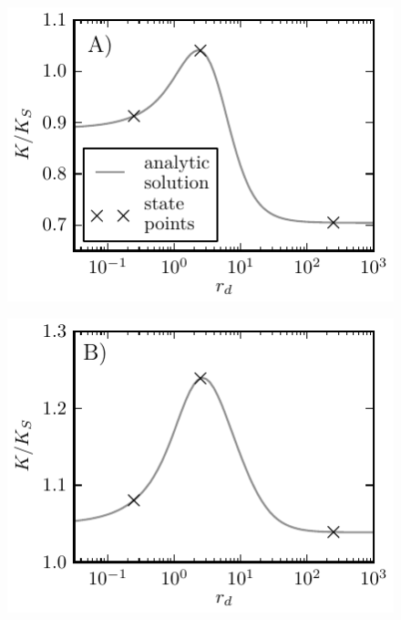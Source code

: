 \begin{minipage}[t]{0.5 \textwidth}
    \begin{figure}[H]
        \includegraphics[width = 1 \textwidth]{plots/rb_rate.pdf}
    \end{figure}
\end{minipage}\begin{minipage}[t]{0.5 \textwidth}
    \begin{figure}[H]
        \includegraphics[width = 1 \textwidth]{plots/ab_rate.pdf}
    \end{figure}
\end{minipage}

